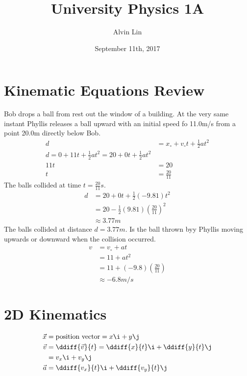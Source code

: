 \documentclass{math}
\title{University Physics 1A}
\author{Alvin Lin}
\date{September 11th, 2017}
\begin{document}
\maketitle

\section*{Kinematic Equations Review}
Bob drops a ball from rest out the window of a building. At the very same
instant Phyllis releases a ball upward with an initial speed fo 11.0m/s
from a point 20.0m directly below Bob.
\begin{align*}
  d &= x_{\circ}+v_{\circ}t+\frac{1}{2}at^2 \\
  d = 0+11t+\frac{1}{2}at^2 = 20+0t+\frac{1}{2}at^2 \\
  11t &= 20 \\
  t &= \frac{20}{11}
\end{align*}
The balls collided at time \( t = \frac{20}{11}s \).
\begin{align*}
  d &= 20+0t+\frac{1}{2}(-9.81)t^2 \\
  &= 20-\frac{1}{2}(9.81)(\frac{20}{11})^2 \\
  &\approx 3.77m
\end{align*}
The balls collided at distance \( d = 3.77m \).
Is the ball thrown byy Phyllis moving upwards or downward when the collision
occurred.
\begin{align*}
  v &= v_{\circ}+at \\
  &= 11+at^2 \\
  &= 11+(-9.8)(\frac{20}{11}) \\
  &\approx -6.8m/s
\end{align*}

\section*{2D Kinematics}
\begin{center}
\end{center}
\begin{align*}
  \vec{x} &= \text{position vector} = x\i+y\j \\
  \vec{v} &= \ddiff{\vec{v}}{t} = \ddiff{x}{t}\i+\ddiff{y}{t}\j \\
  &= v_x\i+v_y\j \\
  \vec{a} &= \ddiff{v_x}{t}\i+\ddiff{v_y}{t}\j
\end{align*}
\end{document}
